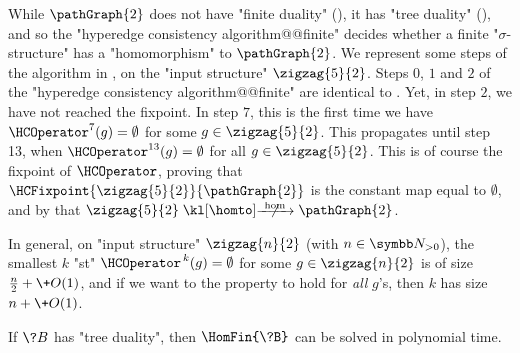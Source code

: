 \begin{example}
	\AP\label{ex:zigzag-HC-P2}
	While $\pathGraph{2}$ does not have "finite duality" (), it has
	"tree duality" (), and so the "hyperedge consistency algorithm@@finite"
	decides whether a finite "$\sigma$-structure" has a "homomorphism" to $\pathGraph{2}$.
	We represent some steps of the algorithm in ,
	on the "input structure" $\zigzag{5}{2}$.
	Steps $0$, $1$ and $2$ of the "hyperedge consistency algorithm@@finite"
	are identical to .
	Yet, in step $2$, we have not reached the fixpoint.
	In step $7$, this is the first time
	we have $\HCOperator^{7}(g) = \emptyset$ for some
	$g\in \zigzag{5}{2}$. This propagates until step 13, 
	when $\HCOperator^{13}(g) = \emptyset$
	for all $g\in \zigzag{5}{2}$. This is of course the fixpoint of $\HCOperator$,
	proving that $\HCFixpoint{\zigzag{5}{2}}{\pathGraph{2}}$ is the constant map
	equal to $\emptyset$, and by 
	that $\zigzag{5}{2} \nothomto \pathGraph{2}$.

	In general, on "input structure" $\zigzag{n}{2}$ (with $n\in\Np$),
	the smallest $k$ "st" $\HCOperator^{\,k}(g) = \emptyset$
	for some $g \in \zigzag{n}{2}$ is of size $\frac{n}{2} + \+O(1)$,
	and if we want to the property to hold for \emph{all} $g$'s,
	then $k$ has size $n + \+O(1)$.
\end{example}

\begin{corollary}
	If $\?B$ has "tree duality", then $\HomFin{\?B}$ can be solved in
	polynomial time.
\end{corollary}



